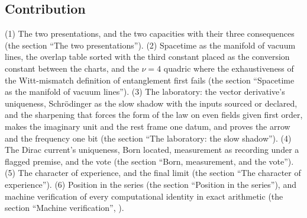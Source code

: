 \documentclass[11pt]{article}
\theoremstyle{definition}
\theoremstyle{plain}
\begin{document}
\subsection*{Contribution}
\label{c:note.one-relation.setting-contribution}
(1) The two presentations, and the two capacities with their three consequences (the section ``The two presentations''). (2) Spacetime as the manifold of vacuum lines, the overlap table sorted with the third constant placed as the conversion constant between the charts, and the $\nu = 4$ quadric where the exhaustiveness of the Witt-mismatch definition of entanglement first fails (the section ``Spacetime as the manifold of vacuum lines''). (3) The laboratory: the vector derivative's uniqueness, Schr\"odinger as the slow shadow with the inputs sourced or declared, and the sharpening that forces the form of the law on even fields given first order, makes the imaginary unit and the rest frame one datum, and proves the arrow and the frequency one bit (the section ``The laboratory: the slow shadow''). (4) The Dirac current's uniqueness, Born located, measurement as recording under a flagged premise, and the vote (the section ``Born, measurement, and the vote''). (5) The character of experience, and the final limit (the section ``The character of experience''). (6) Position in the series (the section ``Position in the series''), and machine verification of every computational identity in exact arithmetic (the section ``Machine verification'', \cite{ButlerVerifyT16}).
\end{document}
